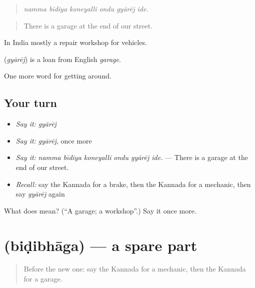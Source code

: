 \begin{quote}
\emph{namma bīdiya koneyalli ondu gyārēj ide.}
\end{quote}

\begin{quote}
There is a garage at the end of our street.
\end{quote}

In India mostly a repair workshop for vehicles.

\begin{cousinweb}
\textbf{} (\emph{gyārēj}) is a loan from English \emph{garage}.
\end{cousinweb}

\begin{grammarlens}[title={What you've built}]
One more word for getting around.
\end{grammarlens}

\subsection*{Your turn}
\begin{itemize}
\raggedright
  \item \emph{Say it:} \emph{gyārēj}
  \item \emph{Say it:} \emph{gyārēj}, once more
  \item \emph{Say it:} \emph{namma bīdiya koneyalli ondu gyārēj ide.} — There is a garage at the end of our street.
  \item \emph{Recall:} say the Kannada for a brake, then the Kannada for a mechanic, then say \emph{gyārēj} again
\end{itemize}

\begin{tcolorbox}[breakable,colback=teal!4,colframe=teal!35!black,title={Before you move on}]
What does  mean? (\textquotedblleft{}A garage; a workshop\textquotedblright{}.) Say it once more.
\end{tcolorbox}
\section[\texorpdfstring{\kn{ಬಿಡಿಭಾಗ} (biḍibhāga)}{ಬಿಡಿಭಾಗ (biḍibhāga)}]{ (biḍibhāga) — a spare part}

\label{lesson:KA-C450-bidibhaga}



\begin{quote}
Before the new one: say the Kannada for a mechanic, then the Kannada for a garage.
\end{quote}

